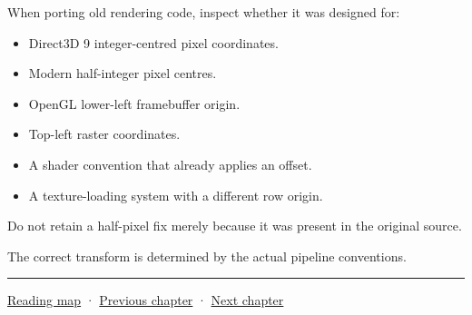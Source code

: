 When porting old rendering code, inspect whether it was designed for:

\begin{itemize}
\tightlist
\item
  Direct3D 9 integer-centred pixel coordinates.
\item
  Modern half-integer pixel centres.
\item
  OpenGL lower-left framebuffer origin.
\item
  Top-left raster coordinates.
\item
  A shader convention that already applies an offset.
\item
  A texture-loading system with a different row origin.
\end{itemize}

Do not retain a half-pixel fix merely because it was present in the original source.

The correct transform is determined by the actual pipeline conventions.

\begin{center}\rule{0.5\linewidth}{0.5pt}\end{center}

\hyperref[volume-reading-map]{Reading map} · \hyperref[02-foundations-ii-ch032-geometry-becomes-an-image-and-an-inverse-problem]{Previous chapter} · \hyperref[02-foundations-ii-ch034-robust-predicates-and-camera-sensitivity]{Next chapter}
